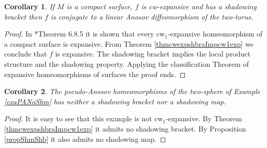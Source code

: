 \documentclass[12pt]{amsart}
\theoremstyle{plain}
\newtheorem{thm}{Theorem}[section]
\newtheorem{cor}[thm]{Corollary}
\theoremstyle{definition}
\theoremstyle{remark}
\newcommand{\azul}[1]{\textcolor{blue}{#1}}
\newcommand{\rojo}[1]{\textcolor{red}{#1}}
\begin{document}

\begin{cor}
	If $M$ is a compact surface,
	$f$ is cw-expansive and has a shadowing bracket then $f$
	is conjugate to a linear Anosov diffeomorphism of the two-torus.
\end{cor}

\begin{proof}
	In \cite{ArDend}*{Theorem 6.8.5}
	it is shown that every cw$_1$-expansive homeomorphism of a compact surface is expansive. From Theorem
	\ref{thmcwexpshbraImpcw1exp} we conclude that $f$ is expansive.
	The shadowing bracket implies the local product structure and the shadowing property.
	Applying the classification Theorem of expansive homeomorphisms of surfaces \cites{Lew89,Hi90} the proof ends.
\end{proof}

\begin{cor}
	The pseudo-Anosov homeomorphisms of the two-sphere of Example \ref{exaPANoShm}
	has neither a shadowing bracket nor a shadowing map.
\end{cor}

\begin{proof}
	It is easy to see that this example is not cw$_1$-expansive.
	By Theorem \ref{thmcwexpshbraImpcw1exp} it admits no
	shadowing bracket.
	By Proposition \ref{propShmShb} it also admits no shadowing map.
\end{proof}

%
%
%
%
\end{document}
